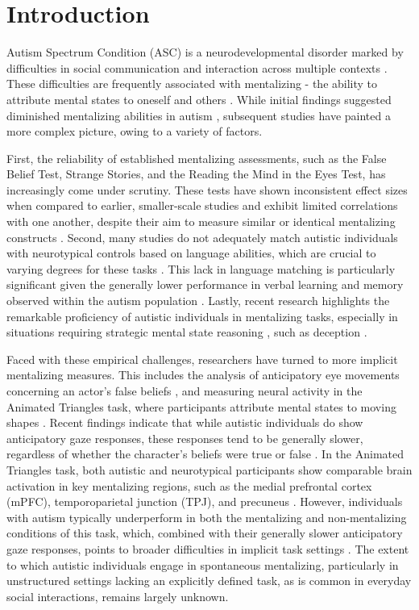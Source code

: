 \thispagestyle{empty}

\newpage

\section{Introduction}
Autism Spectrum Condition (ASC) is a neurodevelopmental disorder marked by difficulties in social communication and interaction across multiple contexts \citep{apa2013}. These difficulties are frequently associated with mentalizing - the ability to attribute mental states to oneself and others \citep{premack1978,wimmer1983}. While initial findings suggested diminished mentalizing abilities in autism \citep{baron-cohen1985,happe1994}, subsequent studies have painted a more complex picture, owing to a variety of factors.

First, the reliability of established mentalizing assessments, such as the False Belief Test, Strange Stories, and the Reading the Mind in the Eyes Test, has increasingly come under scrutiny. These tests have shown inconsistent effect sizes when compared to earlier, smaller-scale studies and exhibit limited correlations with one another, despite their aim to measure similar or identical mentalizing constructs \citep{gernsbacher2019,higgins2024,schaafsma2015,yeung2024}. Second, many studies do not adequately match autistic individuals with neurotypical controls based on language abilities, which are crucial to varying degrees for these tasks \citep{betz2019}. This lack in language matching is particularly significant given the generally lower performance in verbal learning and memory observed within the autism population \citep{velikonja2019}. Lastly, recent research highlights the remarkable proficiency of autistic individuals in mentalizing tasks, especially in situations requiring strategic mental state reasoning \citep{bowler1992,pantelis2017}, such as deception \citep{vantiel2021}.

Faced with these empirical challenges, researchers have turned to more implicit mentalizing measures. This includes the analysis of anticipatory eye movements concerning an actor's false beliefs \citep{senju2009}, and measuring neural activity in the Animated Triangles task, where participants attribute mental states to moving shapes \citep{abell2000}. Recent findings indicate that while autistic individuals do show anticipatory gaze responses, these responses tend to be generally slower, regardless of whether the character's beliefs were true or false \citep{glenwright2021,schuwerk2016}. In the Animated Triangles task, both autistic and neurotypical participants show comparable brain activation in key mentalizing regions, such as the medial prefrontal cortex (mPFC), temporoparietal junction (TPJ), and precuneus \citep{moessnang2020}. However, individuals with autism typically underperform in both the mentalizing and non-mentalizing conditions of this task, which, combined with their generally slower anticipatory gaze responses, points to broader difficulties in implicit task settings \citep{wilson2021}. The extent to which autistic individuals engage in spontaneous mentalizing, particularly in unstructured settings lacking an explicitly defined task, as is common in everyday social interactions, remains largely unknown.

